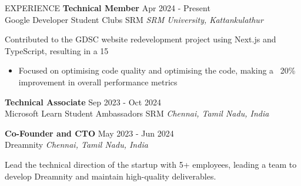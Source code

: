 \documentclass{resume}
\begin{document}
\begin{rSection}{EXPERIENCE}
\textbf{Technical Member} \hfill Apr 2024 - Present\\
Google Developer Student Clubs SRM \hfill \textit{SRM University, Kattankulathur}

Contributed to the GDSC website redevelopment project using Next.js and TypeScript, resulting in a 15%

\begin{itemize}
\item Focused on optimising code quality and optimising the code, making a ~20\% improvement in overall performance metrics
\end{itemize}
\textbf{Technical Associate} \hfill Sep 2023 - Oct 2024\\
Microsoft Learn Student Ambassadors SRM \hfill \textit{Chennai, Tamil Nadu, India}



\textbf{Co-Founder and CTO} \hfill May 2023 - Jun 2024\\
Dreamnity \hfill \textit{Chennai, Tamil Nadu, India}

Lead the technical direction of the startup with 5+ employees, leading a team to develop Dreamnity and maintain high-quality deliverables.


\end{rSection}

\vspace{1.5em}

\end{document}

